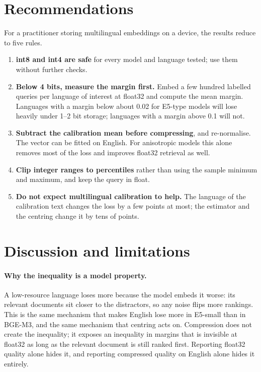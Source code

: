 \documentclass[10pt]{article}
\begin{document}
\section{Recommendations}\label{sec:reco}
For a practitioner storing multilingual embeddings on a device, the results reduce to five rules.
\begin{enumerate}[nosep]
\item \textbf{int8 and int4 are safe} for every model and language tested; use them without further checks.
\item \textbf{Below 4 bits, measure the margin first.} Embed a few hundred labelled queries per language of interest at float32 and compute the mean margin. Languages with a margin below about 0.02 for E5-type models will lose heavily under 1--2 bit storage; languages with a margin above 0.1 will not.
\item \textbf{Subtract the calibration mean before compressing}, and re-normalise. The vector can be fitted on English. For anisotropic models this alone removes most of the loss and improves float32 retrieval as well.
\item \textbf{Clip integer ranges to percentiles} rather than using the sample minimum and maximum, and keep the query in float.
\item \textbf{Do not expect multilingual calibration to help.} The language of the calibration text changes the loss by a few points at most; the estimator and the centring change it by tens of points.
\end{enumerate}

\section{Discussion and limitations}
\paragraph{Why the inequality is a model property.} A low-resource language loses more because the model embeds it worse: its relevant documents sit closer to the distractors, so any noise flips more rankings. This is the same mechanism that makes English lose more in E5-small than in BGE-M3, and the same mechanism that centring acts on. Compression does not create the inequality; it exposes an inequality in margins that is invisible at float32 as long as the relevant document is still ranked first. Reporting float32 quality alone hides it, and reporting compressed quality on English alone hides it entirely.
\end{document}
